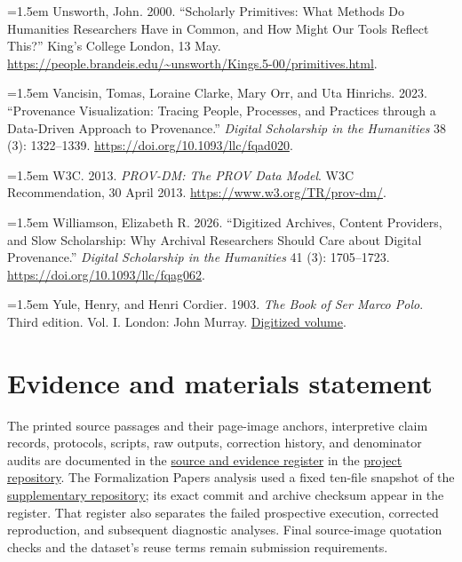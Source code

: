 \documentclass[11pt,a4paper]{article}
\begin{document}
\hangindent=1.5em Unsworth, John. 2000. “Scholarly Primitives: What Methods Do Humanities Researchers Have in Common, and How Might Our Tools Reflect This?” King’s College London, 13 May. \url{https://people.brandeis.edu/~unsworth/Kings.5-00/primitives.html}.


\hangindent=1.5em Vancisin, Tomas, Loraine Clarke, Mary Orr, and Uta Hinrichs. 2023. “Provenance Visualization: Tracing People, Processes, and Practices through a Data-Driven Approach to Provenance.” \emph{Digital Scholarship in the Humanities} 38 (3): 1322–1339. \url{https://doi.org/10.1093/llc/fqad020}.


\hangindent=1.5em W3C. 2013. \emph{PROV-DM: The PROV Data Model}. W3C Recommendation, 30 April 2013. \url{https://www.w3.org/TR/prov-dm/}.


\hangindent=1.5em Williamson, Elizabeth R. 2026. “Digitized Archives, Content Providers, and Slow Scholarship: Why Archival Researchers Should Care about Digital Provenance.” \emph{Digital Scholarship in the Humanities} 41 (3): 1705–1723. \url{https://doi.org/10.1093/llc/fqag062}.


\hangindent=1.5em Yule, Henry, and Henri Cordier. 1903. \emph{The Book of Ser Marco Polo}. Third edition. Vol. I. London: John Murray. \href{https://wellcomecollection.org/works/j5n87wpb}{Digitized volume}.


\endgroup

\section*{Evidence and materials statement}

The printed source passages and their page-image anchors, interpretive claim records, protocols, scripts, raw outputs, correction history, and denominator audits are documented in the \href{https://github.com/MKLEE222/claim-relative-representation/blob/audit/cold-start-20260926/manuscript/humanities\_first\_v1/SOURCE\_NOTES\_AND\_SUBMISSION\_GAPS.md}{source and evidence register} in the \href{https://github.com/MKLEE222/claim-relative-representation}{project repository}. The Formalization Papers analysis used a fixed ten-file snapshot of the \href{https://github.com/LaraHack/formalization\_papers\_supplemental}{supplementary repository}; its exact commit and archive checksum appear in the register. That register also separates the failed prospective execution, corrected reproduction, and subsequent diagnostic analyses. Final source-image quotation checks and the dataset's reuse terms remain submission requirements.
\end{document}
